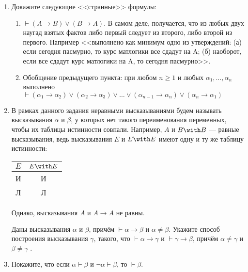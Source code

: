 \documentclass[10pt,a4paper,oneside]{article}
\begin{document}
\begin{enumerate}
\item Докажите следующие <<странные>> формулы:
\begin{enumerate}
\item $\vdash (A \rightarrow B) \vee (B \rightarrow A)$. В самом деле, получается, что из любых двух 
наугад взятых фактов либо первый следует из второго, либо второй из первого. Например <<выполнено как
минимум одно из утверждений: (а) если сегодня пасмурно, то курс матлогики все сдадут на A; (б) наоборот, если все сдадут курс матлогики на A,
то сегодня пасмурно>>.
\item Обобщение предыдущего пункта: при любом $n\ge 1$ и любых $\alpha_1, \dots, \alpha_n$ выполнено 
$\vdash (\alpha_1 \rightarrow \alpha_2) \vee (\alpha_2 \rightarrow \alpha_3) \vee \dots \vee (\alpha_{n-1}\rightarrow\alpha_n)
\vee (\alpha_n\rightarrow\alpha_1)$
\end{enumerate}

\item В рамках данного задания неравными высказываниями будем называть высказывания
$\alpha$ и $\beta$, у которых нет такого переименования переменных, чтобы их
таблицы истинности совпали. Например, $A$ и $B\with B$ --- равные высказывания,
ведь высказывания $E$ и $E\with E$ имеют одну и ту же таблицу истинности:

\begin{center}\begin{tabular}{c|c}
$E$ & $E \with E$\\\hline
И & И\\\hline
Л & Л
\end{tabular}\end{center}

Однако, высказывания $A$ и $A \rightarrow A$ не равны.

Даны высказывания $\alpha$ и $\beta$, причём $\vdash \alpha\rightarrow\beta$ и $\alpha\ne\beta$. 
Укажите способ построения высказывания $\gamma$, такого, что
$\vdash\alpha\rightarrow\gamma$ и $\vdash\gamma\rightarrow\beta$, причём $\alpha\ne\gamma$ и
$\beta\ne\gamma$ .

\item Покажите, что если $\alpha \vdash \beta$ и $\neg\alpha\vdash\beta$, то $\vdash\beta$.
\end{enumerate}
\end{document}

